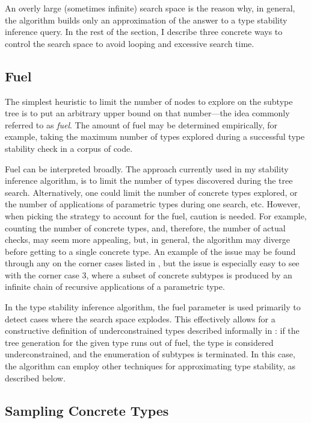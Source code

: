 An overly large (sometimes infinite) search space is the reason why, in general, the
algorithm builds only an approximation of the answer to a type stability
inference query. In the rest of the section, I describe three concrete ways to
control the search space to avoid looping and excessive search time.

\subsection{Fuel}

The simplest heuristic to limit the number of nodes to explore on the subtype tree
is to put an arbitrary upper bound on that number---the idea commonly referred
to as \emph{fuel}. The amount of fuel may be determined empirically, for
example, taking the maximum number of types explored during a successful type
stability check in a corpus of code.

Fuel can be interpreted broadly.
The approach currently used in my stability
inference algorithm, is to limit the number of types discovered during
the tree search.
Alternatively, one could limit the number of concrete
types explored, or the number of applications of parametric types during
one search, etc.
However, when picking the strategy to account for the fuel, caution is needed.
For example, counting the number of concrete types, and, therefore, the number of
actual checks, may seem more appealing, but, in general,
the algorithm may diverge before getting to a single concrete type.
An example of the issue may be found through any on the
corner cases listed in , 
but the issue is especially easy to see
with the corner case 3, where a subset of concrete subtypes is produced 
by an infinite chain of recursive applications of
a parametric type.

In the type stability inference algorithm, the fuel parameter
is used primarily to detect cases where the search space explodes.
This effectively allows for a
constructive definition of underconstrained types described informally in
: if the tree generation for the given type runs out
of fuel, the type is considered underconstrained, and the enumeration
of subtypes is terminated. In this case, the algorithm can employ other techniques
for approximating type stability, as described below.

\subsection{Sampling Concrete Types}

